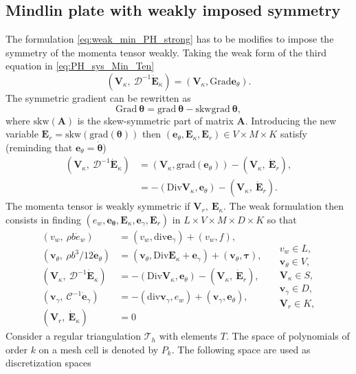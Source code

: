 \documentclass{ifacconf}
\begin{document}
\subsection{Mindlin plate with weakly imposed symmetry}
The formulation \eqref{eq:weak_min_PH_strong} has to be modifies to impose the symmetry of the momenta tensor weakly. Taking the weak form of the third equation in \eqref{eq:PH_sys_Min_Ten}
\[
(\bm{V}_\kappa, \ \mathcal{D}^{-1} \dot{\bm{E}}_\kappa) = (\bm{V}_\kappa, \mathrm{Grad}\bm{e}_\theta ). 
\]
The symmetric gradient can be rewritten as 
\[
\mathrm{Grad}\ \bm{\theta} = \mathrm{grad}\ \bm{\theta} - \mathrm{skw}\mathrm{grad}\ \bm{\theta},
\]
where $\mathrm{skw}(\bm{A})$ is the skew-symmetric part of matrix $\bm{A}$. Introducing the new variable $\bm{E}_r = \mathrm{skw}(\mathrm{grad}(\bm{\theta}))$ then $(\bm{e}_\theta, \bm{E}_\kappa, \bm{E}_r) \in V\times M\times K$ satisfy (reminding that $\bm{e}_\theta = \dot{\bm{\theta}}$)
\begin{equation*}
	\begin{aligned}
	(\bm{V}_\kappa, \ \mathcal{D}^{-1} \dot{\bm{E}}_\kappa) &= (\bm{V}_\kappa, \mathrm{grad}(\bm{e}_\theta)) - (\bm{V}_\kappa, \ \dot{\bm{E}}_r), \\
	&= -(\mathrm{Div}\bm{V}_\kappa, \bm{e}_\theta) - (\bm{V}_\kappa, \ \dot{\bm{E}}_r).
	\end{aligned}
\end{equation*}
The momenta tensor is weakly symmetric if $\bm{V}_r, \ \bm{E}_{\kappa}$. The weak formulation then consists in finding $(e_w, \bm{e}_{\bm{\theta}}, \bm{E}_{\kappa}, \bm{e}_{\gamma}, \bm{E}_{r})$ in $L \times V \times M \times D \times K$ so that 
 \begin{equation}
 \label{eq:weak_min_PH_weak}
 \begin{aligned}
 (v_w, \ \rho b \dot{e}_w) &= (v_w, \mathrm{div} \bm{e}_\gamma) + (v_w, f), \\ 
 (\bm{v}_\theta, \ \rho b^3/12  \dot{\bm{e}}_\theta) &= (\bm{v}_\theta, \mathrm{Div} \bm{E}_\kappa + \bm{e}_\gamma) + (\bm{v}_\theta, \bm{\tau}), \\  
 (\bm{V}_\kappa, \ \mathcal{D}^{-1} \dot{\bm{E}}_\kappa) &= -(\mathrm{Div} \bm{V}_\kappa,  \bm{e}_\theta) - (\bm{V}_\kappa, \ \dot{\bm{E}}_r), \\ 
 (\bm{v}_\gamma, \ \mathcal{C}^{-1} \dot{\bm{e}}_\gamma) &= -(\mathrm{div} \bm{v}_\gamma, e_w ) + (\bm{v}_\gamma, \bm{e}_{\theta}), \\ 
 (\bm{V}_r, \ \dot{\bm{E}}_\kappa) &= 0
 \end{aligned} \quad
 \begin{aligned}
 v_w \in L, \\
 \bm{v}_\theta \in V, \\
 \bm{V}_\kappa \in S, \\
 \bm{v}_\gamma \in D, \\
 \bm{V}_r \in K, \\
 \end{aligned}
 \end{equation}
Consider a regular triangulation $\mathcal{T}_h$ with elements $T$. The space of polynomials of order $k$ on a mesh cell is denoted by $P_k$. The following space are used as discretization spaces
\end{document}
